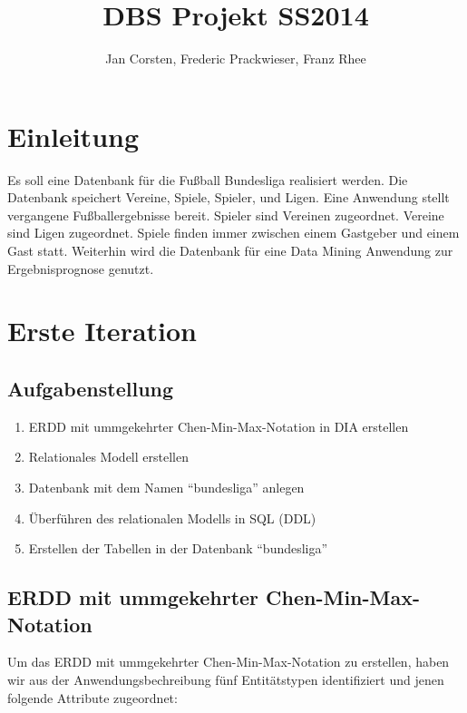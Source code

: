 \documentclass[
10pt,
a4paper
]{scrartcl}
\title{DBS Projekt SS2014}
\author{Jan Corsten, Frederic Prackwieser, Franz Rhee}
\date{}
\begin{document}
\maketitle
\tableofcontents

\section*{Einleitung}

Es soll eine Datenbank f\"{u}r die Fußball Bundesliga realisiert werden. Die Datenbank speichert Vereine, Spiele, Spieler, und Ligen. Eine Anwendung stellt vergangene Fußballergebnisse bereit. Spieler sind Vereinen zugeordnet. Vereine sind Ligen zugeordnet. Spiele finden immer zwischen einem Gastgeber und einem Gast statt.
Weiterhin wird die Datenbank für eine Data Mining Anwendung zur Ergebnisprognose genutzt.

\section{Erste Iteration}

\subsection{Aufgabenstellung}

\begin{enumerate}
  \item ERDD mit ummgekehrter Chen-Min-Max-Notation in DIA erstellen
  \item Relationales Modell erstellen
  \item Datenbank mit dem Namen “bundesliga” anlegen
  \item Überführen des relationalen Modells in SQL (DDL)
  \item Erstellen der Tabellen in der Datenbank “bundesliga”
\end{enumerate}

\subsection{ERDD mit ummgekehrter Chen-Min-Max-Notation}

Um das ERDD mit ummgekehrter Chen-Min-Max-Notation zu erstellen, haben wir aus der Anwendungsbechreibung fünf Entitätstypen identifiziert und jenen folgende Attribute  zugeordnet:
\end{document}
